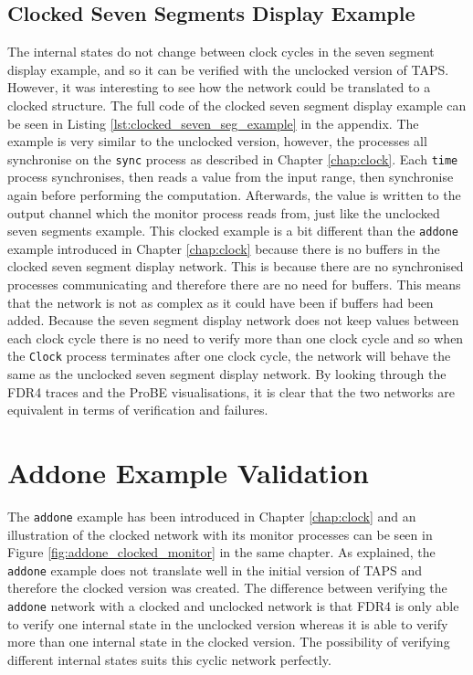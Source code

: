 \subsection{Clocked Seven Segments Display Example}
The internal states do not change between clock cycles in the seven segment display example, and so it can be verified with the unclocked version of TAPS. However, it was interesting to see how the network could be translated to a clocked structure. The full \cspm{} code of the clocked seven segment display example can be seen in Listing \ref{lst:clocked_seven_seg_example} in the appendix. %
The example is very similar to the unclocked version, however, the processes all synchronise on the \texttt{sync} process as described in Chapter \ref{chap:clock}. Each \texttt{time} process synchronises, then reads a value from the input range, then synchronise again before performing the computation. Afterwards, the value is written to the output channel which the monitor process reads from, just like the unclocked seven segments example. This clocked example is a bit different than the \texttt{addone} example introduced in Chapter \ref{chap:clock} because there is no buffers in the clocked seven segment display network. This is because there are no synchronised processes communicating and therefore there are no need for buffers. This means that the network is not as complex as it could have been if buffers had been added.
Because the seven segment display network does not keep values between each clock cycle there is no need to verify more than one clock cycle and so when the \texttt{Clock} process terminates after one clock cycle, the network will behave the same as the unclocked seven segment display network. By looking through the FDR4 traces and the ProBE visualisations, it is clear that the two networks are equivalent in terms of verification and failures.
\section{Addone Example Validation}
The \texttt{addone} example has been introduced in Chapter \ref{chap:clock} and an illustration of the clocked network with its monitor processes can be seen in Figure \ref{fig:addone_clocked_monitor} in the same chapter. As explained, the \texttt{addone} example does not translate well in the initial version of TAPS and therefore the clocked version was created.
The difference between verifying the \texttt{addone} network with a clocked and unclocked network is that FDR4 is only able to verify one internal state in the unclocked version whereas it is able to verify more than one internal state in the clocked version. The possibility of verifying different internal states suits this cyclic network perfectly.\\

